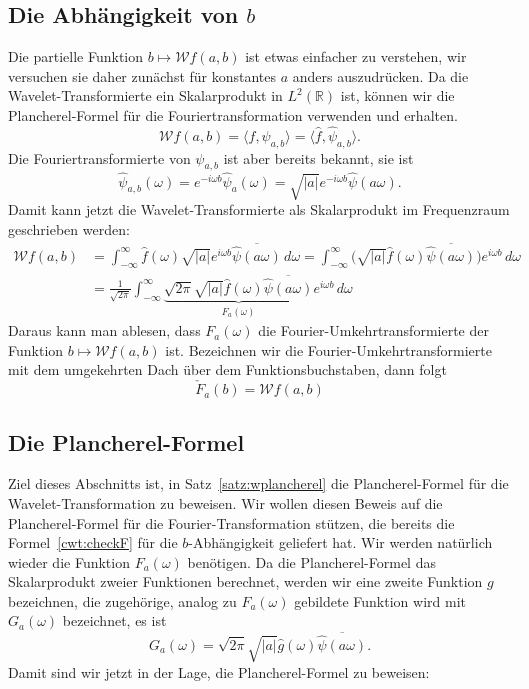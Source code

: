 \subsection{Die Abhängigkeit von $b$}
Die partielle Funktion $b\mapsto \mathcal{W}f(a,b)$ ist etwas einfacher
zu verstehen, wir versuchen sie daher zunächst für konstantes $a$
anders auszudrücken.
Da die Wavelet-Transformierte ein Skalarprodukt in $L^2(\mathbb R)$
ist, können wir die Plancherel-Formel für die Fouriertransformation
verwenden und erhalten.
\[
\mathcal{W}f (a,b)
=
\langle f,\psi_{a,b} \rangle
=
\langle \hat{f}, \hat{\psi}_{a,b}\rangle.
\]
Die Fouriertransformierte von $\psi_{a,b}$ ist aber bereits bekannt,
sie ist
\[
\hat{\psi}_{a,b}(\omega)
=
e^{-i\omega b} \hat{\psi}_a(\omega)
=
\sqrt{|a|}e^{-i\omega b} \hat{\psi}(a\omega).
\]
Damit kann jetzt die Wavelet-Transformierte als Skalarprodukt im
Frequenzraum geschrieben werden:
\begin{align*}
\mathcal{W}f (a,b)
&=
\int_{-\infty}^\infty 
\hat{f}(\omega)
\sqrt{|a|}e^{i\omega b} \overline{\hat{\psi}(a\omega)}
\,d\omega
=
\int_{-\infty}^\infty
\bigl(
\sqrt{|a|}
\hat{f}(\omega)
\overline{\hat{\psi}(a\omega)}
\bigr)
e^{i\omega b}
\,d\omega
\\
&=
\frac1{\sqrt{2\pi}}
\int_{-\infty}^\infty
\underbrace{
\sqrt{2\pi}
\sqrt{|a|}
\hat{f}(\omega)
\overline{\hat{\psi}(a\omega)}}_{\displaystyle F_a(\omega)}
e^{i\omega b}
\,d\omega
\end{align*}
Daraus kann man ablesen, dass $F_a(\omega)$ die Fourier-Umkehrtransformierte
der Funktion $b\mapsto \mathcal{W}f(a,b)$ ist.
Bezeichnen wir die Fourier-Umkehrtransformierte mit dem umgekehrten
Dach über dem Funktionsbuchstaben,
dann folgt
\begin{equation}
\check{F}_a(b) = \mathcal{W}f(a, b)
\label{cwt:checkF}
\end{equation}

\subsection{Die Plancherel-Formel}
Ziel dieses Abschnitts ist, in Satz~\ref{satz:wplancherel} die
Plancherel-Formel für die Wavelet-Transformation zu beweisen.
Wir wollen diesen Beweis auf die Plancherel-Formel für die 
Fourier-Transformation stützen, die bereits die Formel~\eqref{cwt:checkF}
für die $b$-Abhängigkeit geliefert hat.
Wir werden natürlich wieder die Funktion $F_a(\omega)$ benötigen.
Da die Plancherel-Formel das Skalarprodukt zweier Funktionen berechnet,
werden wir eine zweite Funktion $g$ bezeichnen, die zugehörige, analog
zu $F_a(\omega)$ gebildete Funktion wird mit $G_a(\omega)$ bezeichnet,
es ist
\[
G_a(\omega)
=
\sqrt{2\pi}\sqrt{|a|}
\hat{g}(\omega)
\overline{\hat{\psi}(a\omega)}.
\]
Damit sind wir jetzt in der Lage, die Plancherel-Formel zu beweisen:

